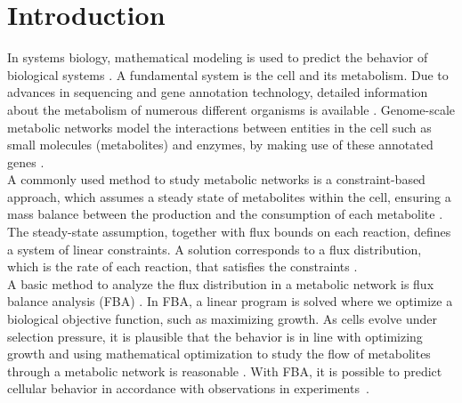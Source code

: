 \thispagestyle{plain}
\chapter*{Introduction}

In systems biology, mathematical modeling is used to predict the behavior of biological systems \cite{intro_computational_systems_biology}. A fundamental system is the cell and its metabolism.
Due to advances in sequencing and gene annotation technology, detailed information about the metabolism of numerous different organisms is available \cite{palsson_systems_biology}. Genome-scale metabolic networks model the interactions between entities in the cell such as small molecules (metabolites) and enzymes, by making use of these annotated genes \cite{intro_computational_systems_biology}.\\
A commonly used method to study metabolic networks is a constraint-based approach, which assumes a steady state of metabolites within the cell, ensuring a mass balance between the production and the consumption of each metabolite \cite{palsson_systems_biology}. The steady-state assumption, together with flux bounds on each reaction, defines a system of linear constraints. A solution corresponds to a flux distribution, which is the rate of each reaction, that satisfies the constraints \cite{intro_computational_systems_biology}. \\ %
A basic method to analyze the flux distribution in a metabolic network is flux balance analysis (FBA) \cite{FBA}. In FBA, a linear program is solved where we optimize a biological objective function, such as maximizing growth. As cells evolve under selection pressure, it is plausible that the behavior is in line with optimizing growth and using mathematical optimization to study the flow of metabolites through a metabolic network is reasonable \cite{palsson_systems_biology}. With FBA, it is possible to predict cellular behavior in accordance with observations in experiments~\cite{FBA}. \\
